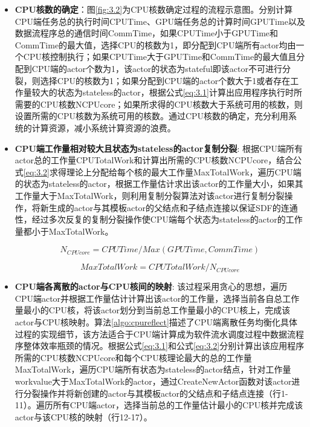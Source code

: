 \begin{itemize}	
  \item {\bf CPU核数的确定}：图\ref{fig:3.2}为CPU核数确定过程的流程示意图。分别计算CPU端任务总的执行时间CPUTime、GPU端任务总的计算时间GPUTime以及数据流程序总的通信时间CommTime，如果CPUTime小于GPUTime和CommTime的最大值，选择CPU的核数为1，即分配到CPU端所有actor均由一个CPU核控制执行；如果CPUTime大于GPUTime和CommTime的最大值且分配到CPU端的actor个数为1，该actor的状态为stateful即该actor不可进行分裂，则选择CPU的核数为1；如果分配到CPU端的actor个数大于1或者存在工作量较大的状态为stateless的actor，根据公式\ref{eq:3.1}计算出应用程序执行时所需要的CPU核数NCPUcore；如果所求得的CPU核数大于系统可用的核数，则设置所需的CPU核数为系统可用的核数。通过CPU核数的确定，充分利用系统的计算资源，减小系统计算资源的浪费。

  \item {\bf CPU端工作量相对较大且状态为stateless的actor复制分裂}: 根据CPU端所有actor总的工作量CPUTotalWork和计算出所需的CPU核数NCPUcore，结合公式\ref{eq:3.2}求得理论上分配给每个核的最大工作量MaxTotalWork，遍历CPU端的状态为stateless的actor，根据工作量估计求出该actor的工作量大小，如果其工作量大于MaxTotalWork，则利用复制分裂算法对该actor进行复制分裂操作，将新生成的actor与其模板actor的父结点和子结点连接以保证SDF的连通性，经过多次反复的复制分裂操作使CPU端每个状态为stateless的actor的工作量都小于MaxTotalWork。
  
  \begin{equation}
    N_{CPUcore} = CPUTime/Max(GPUTime,CommTime) \label{eq:3.1}
  \end{equation}

  \begin{equation}
    MaxTotalWork = CPUTotalWork/N_{CPUcore} \label{eq:3.2}
  \end{equation}

  \item {\bf CPU端各离散的actor与CPU核间的映射}: 该过程采用贪心的思想，遍历CPU端actor并根据工作量估计计算出该actor的工作量，选择当前各自总工作量最小的CPU核，将该actor划分到当前总工作量最小的CPU核上，完成该actor与CPU核映射。算法\ref{algo:cpureflect}描述了CPU端离散任务均衡化具体过程的实现细节，该方法适合于CPU端计算成为软件流水调度过程中数据流程序整体效率瓶颈的情况。根据公式\ref{eq:3.1}和公式\ref{eq:3.2}分别计算出该应用程序所需的CPU核数NCPUcore和每个CPU核理论最大的总的工作量MaxTotalWork，遍历CPU端所有状态为stateless的actor结点，针对工作量workvalue大于MaxTotalWork的actor，通过CreateNewActor函数对该actor进行分裂操作并将新创建的actor与其模板actor的父结点和子结点连接（行1-11）。遍历所有CPU端actor，选择当前总的工作量估计最小的CPU核并完成该actor与该CPU核的映射（行12-17）。
\end{itemize}

